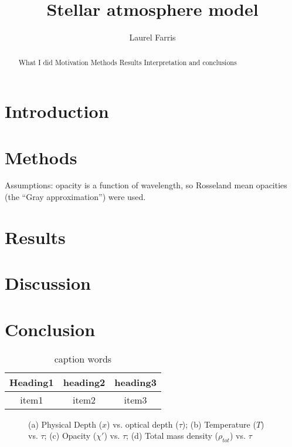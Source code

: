 \documentclass[preprint]{aastex}
\begin{document}
\title{Stellar atmosphere model}
\author{Laurel Farris}

\begin{abstract}
    What I did
    Motivation
    Methods
    Results
    Interpretation and conclusions
\end{abstract}

\section{Introduction}\label{intro}

\section{Methods}
Assumptions: opacity is a function of wavelength, so Rosseland mean
opacities (the ``Gray approximation'') were used.

\section{Results}
\section{Discussion}
\section{Conclusion}


\begin{table}[h]
    \centering
    \begin{tabular}{c c c}
        \hline\hline
        Heading1 & heading2 & heading3 \\
        \hline
        item1 & item2 & item3 \\
    \end{tabular}
    \caption{caption words}
    \label{labelname}
\end{table}

\begin{figure}[htb!]  %
    \caption{(a) Physical Depth ($x$) vs. optical depth ($\tau$);
        (b) Temperature ($T$) vs. $\tau$;
        (c) Opacity ($\chi'$) vs. $\tau$;
        (d) Total mass density ($\rho_{tot}$) vs. $\tau$ }
\end{figure}
\end{document}
